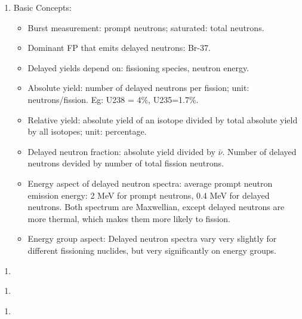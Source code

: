 \documentclass{school-22.211-notes}
\date{May 23, 2012}
\begin{document}
\maketitle

\begin{enumerate}
\item Basic Concepts: 
  \begin{itemize}
  \item Burst measurement: prompt neutrons; saturated: total neutrons. 
  \item Dominant FP that emits delayed neutrons: Br-37. 
  \item Delayed yields depend on: fissioning species, neutron energy.  
  \item Absolute yield: number of delayed neutrons per fission; unit: neutrons/fission. Eg: U238 = 4\%, U235=1.7\%. 
  \item Relative yield: absolute yield of an isotope divided by total absolute yield by all isotopes; unit: percentage. 
  \item Delayed neutron fraction: absolute yield divided by $\bar{\nu}$. Number of delayed neutrons devided by number of total fission neutrons. 
  \item Energy aspect of delayed neutron spectra: average prompt neutron emission energy: 2 MeV for prompt neutrons, 0.4 MeV for delayed neutrons. Both spectrum are Maxwellian, except delayed neutrons are more thermal, which makes them more likely to fission. 
  \item Energy group aspect: Delayed neutron spectra vary very slightly for different fissioning nuclides, but very significantly on energy groups. 
  \end{itemize}
\end{enumerate}


\clearpage
{}
\begin{enumerate}
\item
\end{enumerate}


\clearpage
{}
\begin{enumerate}
\item
\end{enumerate}


\clearpage
{}
\begin{enumerate}
\item
\end{enumerate}
\end{document}
